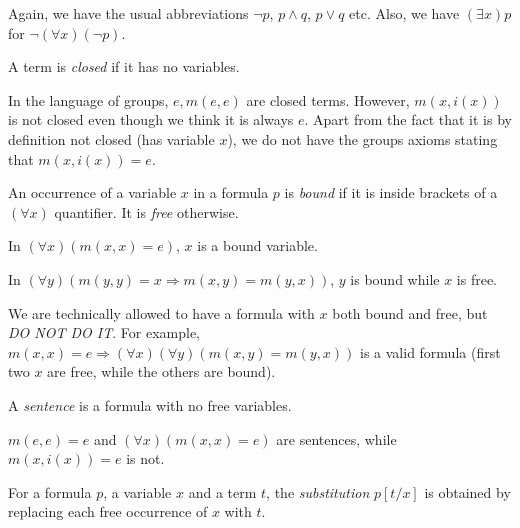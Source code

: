 \documentclass[a4paper]{article}
\begin{document}
Again, we have the usual abbreviations $\neg p$, $p\wedge q$, $p\vee q$ etc. Also, we have $(\exists x)p$ for $\neg(\forall x)(\neg p)$.

\begin{defi}
  A term is \emph{closed} if it has no variables.
\end{defi}

\begin{eg}
  In the language of groups, $e, m(e, e)$ are closed terms. However, $m(x, i(x))$ is not closed even though we think it is always $e$. Apart from the fact that it is by definition not closed (has variable $x$), we do not have the groups axioms stating that $m(x, i(x)) = e$.
\end{eg}

\begin{defi}
  An occurrence of a variable $x$ in a formula $p$ is \emph{bound} if it is inside brackets of a $(\forall x)$ quantifier. It is \emph{free} otherwise.
\end{defi}

\begin{eg}
  In $(\forall x)(m(x, x) = e)$, $x$ is a bound variable.

  In $(\forall y)(m(y, y) = x \Rightarrow m(x, y) = m(y, x))$, $y$ is bound while $x$ is free.

  We are technically allowed to have a formula with $x$ both bound and free, but \emph{DO NOT DO IT}. For example, $m(x, x) = e \Rightarrow (\forall x)(\forall y)(m(x, y) = m(y, x))$ is a valid formula (first two $x$ are free, while the others are bound).
\end{eg}

\begin{defi}[Sentence]
  A \emph{sentence} is a formula with no free variables.
\end{defi}

\begin{eg}
  $m(e, e) = e$ and $(\forall x)(m(x, x) = e)$ are sentences, while $m(x, i(x)) = e$ is not.
\end{eg}

\begin{defi}[Substitution]
  For a formula $p$, a variable $x$ and a term $t$, the \emph{substitution} $p[t/x]$ is obtained by replacing each free occurrence of $x$ with $t$.
\end{defi}
\end{document}

